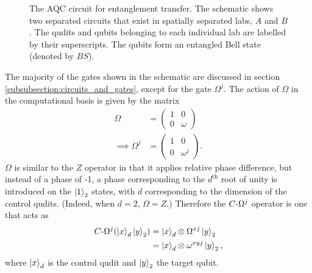 \begin{figure}[h]
    \begin{center}
    \caption{The AQC circuit for entanglement transfer. The schematic shows two separated circuits that exist in spatially separated labs, $A$ and $B$. The qudits and qubits belonging to each individual lab are labelled by their superscripts. The qubits form an entangled Bell state (denoted by $BS$).}
    \label{fig:aqc_circuit_schematic}
    \end{center}
\end{figure}
The majority of the gates shown in the schematic are discussed in section \ref{subsubsection:circuits_and_gates}, except for the gate $\Omega^j$.
The action of $\Omega$ in the computational basis is given by the matrix
\begin{align}
    \Omega &= 
    \begin{pmatrix}
        1 & 0\\
        0 & \omega
    \end{pmatrix}\\
    \implies \Omega^j &=
    \begin{pmatrix}
        1 & 0\\
        0 & \omega^j
    \end{pmatrix}.
\end{align}
$\Omega$ is similar to the $Z$ operator in that it applies relative phase difference, but instead of a phase of -1, a phase corresponding to the $d^{\text{th}}$ root of unity is introduced on the $\ket{1}_2$ states, with $d$ corresponding to the dimension of the control qudits.
(Indeed, when $d=2$, $\Omega = Z$.)
Therefore the $C\text{-}\Omega^j$ operator is one that acts as
\begin{align}
    C\text{-}\Omega^j (\ket{x}_d\ket{y}_2) &= \ket{x}_d\otimes \Omega^{xj}\ket{y}_2\\
    & = \ket{x}_d\otimes \omega^{xyj}\ket{y}_2,
\end{align}
where $\ket{x}_d$ is the control qudit and $\ket{y}_2$ the target qubit.

